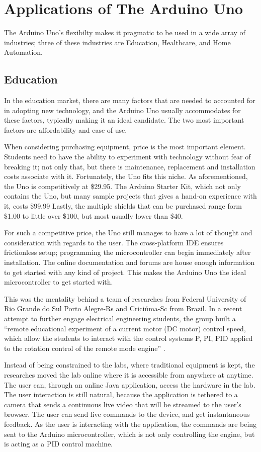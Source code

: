\documentclass[11pt,letterpaper,twocolumn]{article}
\begin{document}
\section{Applications of The Arduino Uno}
The Arduino Uno's flexibilty makes it pragmatic to be used in a wide array of industries; three of these industries are Education, Healthcare, and Home Automation.

\subsection{Education}
In the education market, there are many factors that are needed to accounted for in adopting new technology, and the Arduino Uno usually accommodates for these factors, typically making it an ideal candidate. The two most important factors are affordability and ease of use.

When considering purchasing equipment, price is the most important element. Students need to have the ability to experiment with technology without fear of breaking it; not only that, but there is maintenance, replacement and installation costs associate with it. Fortunately, the Uno fits this niche. As aforementioned, the Uno is competitively at \$\num{29.95}. The Arduino Starter Kit, which not only contains the Uno, but many sample projects that gives a hand-on experience with it, costs \$\num{99.99} Lastly, the multiple shields that can be purchased range form \$\num{1.00} to little over \$\num{100}, but most usually lower than \$\num{40}.

For such a competitive price, the Uno still manages to have a lot of thought and consideration with regards to the user. The cross-platform IDE ensures frictionless setup; programming the microcontroller can begin immediately after installation. The online documentation and forums are house enough information to get started with any kind of project. This makes the Arduino Uno the ideal microcontroller to get started with.

This was the mentality behind a team of researches from Federal University of Rio Grande do Sul Porto Alegre-Rs and Criciúma-Sc  from Brazil. In a recent attempt to further engage electrical engineering students, the group built a ``remote educational experiment of a current motor (DC motor) control speed, which allow the students to interact with the control systems P, PI, PID applied to the rotation control of the remote mode engine'' \cite{engineering}.

Instead of being constrained to the labs, where traditional equipment is kept, the researches moved the lab online where it is accessible from anywhere at anytime. The user can, through an online Java application, access the hardware in the lab. The user interaction is still natural, because the application is tethered to a camera that sends a continuous live video that will be streamed to the user's browser. The user can send live commands to the device, and get instantaneous feedback. As the user is interacting with the application, the commands are being sent to the Arduino microcontroller, which is not only controlling the engine, but is acting as a PID control machine.
\end{document}
